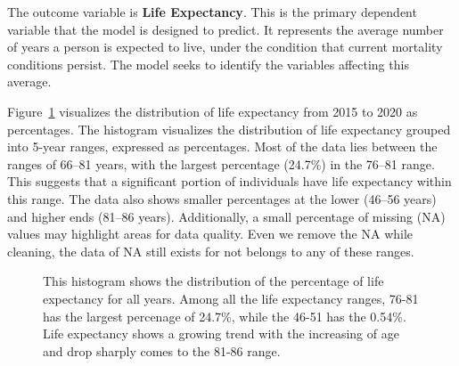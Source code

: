 \documentclass[
  letterpaper,
  DIV=11,
  numbers=noendperiod]{scrartcl}
\begin{document}
The outcome variable is \textbf{Life Expectancy}. This is the primary
dependent variable that the model is designed to predict. It represents
the average number of years a person is expected to live, under the
condition that current mortality conditions persist. The model seeks to
identify the variables affecting this average.

Figure~\ref{fig-expectancy} visualizes the distribution of life
expectancy from 2015 to 2020 as percentages. The histogram visualizes
the distribution of life expectancy grouped into 5-year ranges,
expressed as percentages. Most of the data lies between the ranges of
66--81 years, with the largest percentage (24.7\%) in the 76--81 range.
This suggests that a significant portion of individuals have life
expectancy within this range. The data also shows smaller percentages at
the lower (46--56 years) and higher ends (81--86 years). Additionally, a
small percentage of missing (NA) values may highlight areas for data
quality. Even we remove the NA while cleaning, the data of NA still
exists for not belongs to any of these ranges.

\begin{figure}


\caption{\label{fig-expectancy}This histogram shows the distribution of
the percentage of life expectancy for all years. Among all the life
expectancy ranges, 76-81 has the largest percenage of 24.7\%, while the
46-51 has the 0.54\%. Life expectancy shows a growing trend with the
increasing of age and drop sharply comes to the 81-86 range.}

\end{figure}%
\end{document}
